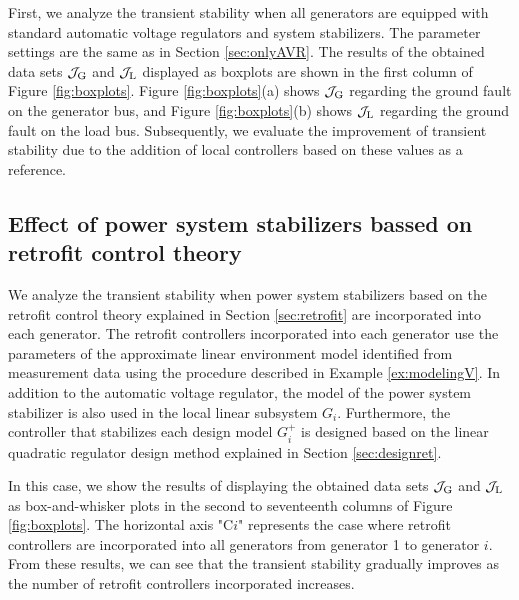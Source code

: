 \documentclass[graybox, envcountchap]{svmult}
\begin{document}
First, we analyze the transient stability when all generators are equipped with
standard automatic voltage regulators and system stabilizers. The parameter
settings are the same as in Section \ref{sec:onlyAVR}. The results of the
obtained data sets $\mathcal{J}_{\rm G}$ and $\mathcal{J}_{\rm L}$ displayed as
boxplots are shown in the first column of Figure \ref{fig:boxplots}. Figure
\ref{fig:boxplots}(a) shows $\mathcal{J}_{\rm G}$ regarding the ground fault on
the generator bus, and Figure \ref{fig:boxplots}(b) shows $\mathcal{J}_{\rm L}$
regarding the ground fault on the load bus. Subsequently, we evaluate the
improvement of transient stability due to the addition of local controllers
based on these values as a reference.

\subsection{Effect of power system stabilizers bassed on retrofit control theory}

We analyze the transient stability when power system stabilizers based on the
retrofit control theory explained in Section \ref{sec:retrofit} are incorporated
into each generator. The retrofit controllers incorporated into each generator
use the parameters of the approximate linear environment model identified from
measurement data using the procedure described in Example \ref{ex:modelingV}. In
addition to the automatic voltage regulator, the model of the power system
stabilizer is also used in the local linear subsystem $G_i$. Furthermore, the
controller that stabilizes each design model $G_i^+$ is designed based on the
linear quadratic regulator design method explained in Section
\ref{sec:designret}.

In this case, we show the results of displaying the obtained data sets
$\mathcal{J}_{\rm G}$ and $\mathcal{J}_{\rm L}$ as box-and-whisker plots in the
second to seventeenth columns of Figure \ref{fig:boxplots}. The horizontal axis
"C$i$" represents the case where retrofit controllers are incorporated into all
generators from generator 1 to generator $i$. From these results, we can see
that the transient stability gradually improves as the number of retrofit
controllers incorporated increases.
\end{document}
